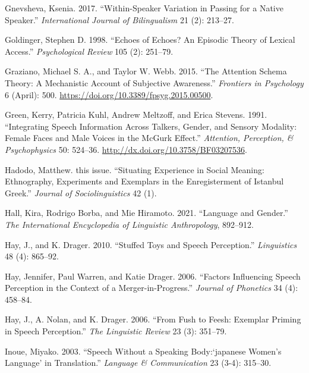 \documentclass[
  letterpaper,
  DIV=11,
  numbers=noendperiod]{scrartcl}
\newlength{\cslhangindent}
\newenvironment{CSLReferences}[2] %
 {\begin{list}{}{%
  \setlength{\itemindent}{0pt}
  \setlength{\leftmargin}{0pt}
  \setlength{\parsep}{0pt}
  \ifodd #1
   \setlength{\leftmargin}{\cslhangindent}
   \setlength{\itemindent}{-1\cslhangindent}
  \fi
  \setlength{\itemsep}{#2\baselineskip}}}
 {\end{list}}
\begin{document}
\begin{CSLReferences}{1}{0}
Gnevsheva, Ksenia. 2017. {``Within-Speaker Variation in Passing for a
Native Speaker.''} \emph{International Journal of Bilingualism} 21 (2):
213--27.

Goldinger, Stephen D. 1998. {``Echoes of Echoes? An Episodic Theory of
Lexical Access.''} \emph{Psychological Review} 105 (2): 251--79.

Graziano, Michael S. A., and Taylor W. Webb. 2015. {``The Attention
Schema Theory: A Mechanistic Account of Subjective Awareness.''}
\emph{Frontiers in Psychology} 6 (April): 500.
\url{https://doi.org/10.3389/fpsyg.2015.00500}.

Green, Kerry, Patricia Kuhl, Andrew Meltzoff, and Erica Stevens. 1991.
{``Integrating Speech Information Across Talkers, Gender, and Sensory
Modality: Female Faces and Male Voices in the McGurk Effect.''}
\emph{Attention, Perception, \& Psychophysics} 50: 524--36.
\url{http://dx.doi.org/10.3758/BF03207536}.

Hadodo, Matthew. this issue. {``Situating Experience in Social Meaning:
Ethnography, Experiments and Exemplars in the Enregisterment of Istanbul
Greek.''} \emph{Journal of Sociolinguistics} 42 (1).

Hall, Kira, Rodrigo Borba, and Mie Hiramoto. 2021. {``Language and
Gender.''} \emph{The International Encyclopedia of Linguistic
Anthropology}, 892--912.

Hay, J., and K. Drager. 2010. {``Stuffed Toys and Speech Perception.''}
\emph{Linguistics} 48 (4): 865--92.

Hay, Jennifer, Paul Warren, and Katie Drager. 2006. {``Factors
Influencing Speech Perception in the Context of a Merger-in-Progress.''}
\emph{Journal of Phonetics} 34 (4): 458--84.

Hay, J., A. Nolan, and K. Drager. 2006. {``From Fush to Feesh: Exemplar
Priming in Speech Perception.''} \emph{The Linguistic Review} 23 (3):
351--79.

Inoue, Miyako. 2003. {``Speech Without a Speaking Body:{`japanese
Women's Language'} in Translation.''} \emph{Language \& Communication}
23 (3-4): 315--30.


\end{CSLReferences}
\end{document}
